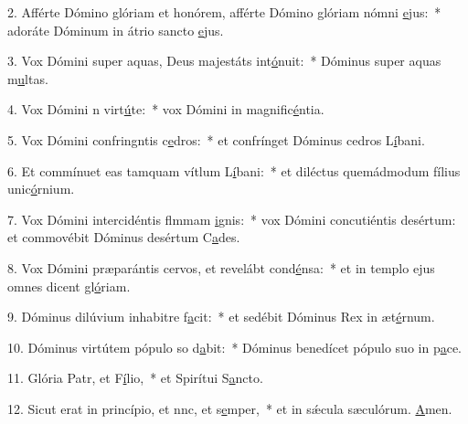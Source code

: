 2. Afférte Dómino glóriam et honórem, afférte Dómino glóriam nómni \uline{e}jus:~* adoráte Dóminum in átrio sancto \uline{e}jus.\par 
3. Vox Dómini super aquas, Deus majestáts int\uline{ó}nuit:~* Dóminus super aquas m\uline{u}ltas.\par 
4. Vox Dómini n virt\uline{ú}te:~* vox Dómini in magnific\uline{é}ntia.\par 
5. Vox Dómini confringntis c\uline{e}dros:~* et confrínget Dóminus cedros L\uline{í}bani.\par 
6. Et commínuet eas tamquam vítlum L\uline{í}bani:~* et diléctus quemádmodum fílius unic\uline{ó}rnium.\par 
7. Vox Dómini intercidéntis flmmam \uline{i}gnis:~* vox Dómini concutiéntis desértum: et commovébit Dóminus desértum C\uline{a}des.\par 
8. Vox Dómini præparántis cervos, et revelábt cond\uline{é}nsa:~* et in templo ejus omnes dicent gl\uline{ó}riam.\par 
9. Dóminus dilúvium inhabitre f\uline{a}cit:~* et sedébit Dóminus Rex in æt\uline{é}rnum.\par 
10. Dóminus virtútem pópulo so d\uline{a}bit:~* Dóminus benedícet pópulo suo in p\uline{a}ce.\par 
11. Glória Patr, et F\uline{í}lio,~* et Spirítui S\uline{a}ncto.\par 
12. Sicut erat in princípio, et nnc, et s\uline{e}mper,~* et in sǽcula sæculórum. \uline{A}men.\par 
